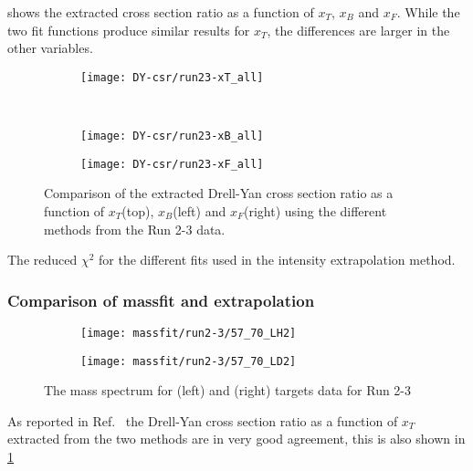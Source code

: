 \documentclass[../main.tex]{subfiles}
\begin{document}
 shows the extracted cross section ratio as a function of $x_T$, $x_B$ and $x_F$.
While the two fit functions produce similar results for $x_T$, the differences are larger in 
the other variables.

\begin{figure}[h!]
	\centering
	\begin{subfigure}{0.6\linewidth}
		\texttt{[image: DY-csr/run23-xT\_all]}
	\end{subfigure}\\
	\begin{subfigure}{0.45\linewidth}
		\texttt{[image: DY-csr/run23-xB\_all]}
	\end{subfigure}
	\begin{subfigure}{0.45\linewidth}
		\texttt{[image: DY-csr/run23-xF\_all]}
	\end{subfigure}
	\caption{Comparison of the extracted Drell-Yan cross section ratio as a function of $x_T$(top),
		$x_B$(left) and $x_F$(right) using the different methods from the Run 2-3
		 data.}
	\label{fig:CSR_Run2-3}
\end{figure}

\begin{table}
\centering
\caption{The reduced $\chi^2$ for the different fits used in the intensity extrapolation method. }
\label{tab:chi_run23}

\end{table}


\subsubsection{Comparison of massfit and extrapolation}
\begin{figure}
	\begin{subfigure}{0.45\linewidth}
		\texttt{[image: massfit/run2-3/57\_70\_LH2]}
	\end{subfigure}
	\begin{subfigure}{0.45\linewidth}
	\texttt{[image: massfit/run2-3/57\_70\_LD2]}
	\end{subfigure}	
	\caption{The mass spectrum for (left) and (right) targets data for Run 2-3}
	\label{fig:massfit_integrated_run23}
\end{figure}



As reported in Ref.~\cite{dove2023} the Drell-Yan cross section ratio as a function of $x_T$ extracted from
the two methods are in very good agreement, this is also shown in \cref{fig:CSR_Run2-3}
\end{document}
